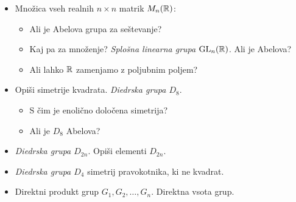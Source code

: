 \begin{enumerate}
\begin{itemize}
        \item Množica vseh realnih $n \times n$ matrik $M_n(\mathbb{R})$:
        \begin{itemize}
            \item Ali je Abelova grupa za seštevanje?
            \item Kaj pa za množenje? \emph{Splošna linearna grupa $\operatorname{GL}_n(\mathbb{R})$}. Ali je Abelova?
            \item Ali lahko $\mathbb{R}$ zamenjamo z poljubnim poljem?
        \end{itemize}
        \item Opiši simetrije kvadrata. \emph{Diedrska grupa $D_{8}$}. 
        \begin{itemize}
            \item S čim je enolično določena simetrija?
            \item Ali je $D_8$ Abelova?
        \end{itemize}
        \item \emph{Diedrska grupa $D_{2n}$}. Opiši elementi $D_{2n}$.
        \item \emph{Diedrska grupa $D_4$} simetrij pravokotnika, ki ne kvadrat.
        \item Direktni produkt grup $G_1, G_2, \ldots, G_n$. Direktna vsota grup.
    \end{itemize}


\end{enumerate}
